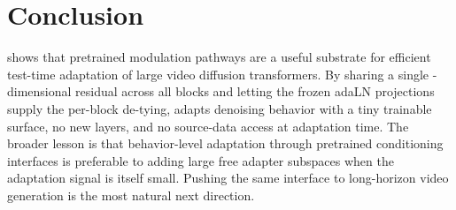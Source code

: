 \section{Conclusion}
\label{sec:conclusion}

\method shows that pretrained modulation pathways are a useful substrate for
efficient test-time adaptation of large video diffusion transformers. By
sharing a single \dimt-dimensional residual across all \nblocks blocks and
letting the frozen adaLN projections supply the per-block de-tying, \method
adapts denoising behavior with a tiny trainable surface, no new layers, and
no source-data access at adaptation time. The broader lesson is that
behavior-level adaptation through pretrained conditioning interfaces is
preferable to adding large free adapter subspaces when the adaptation signal
is itself small. Pushing the same interface to long-horizon video generation
is the most natural next direction.
